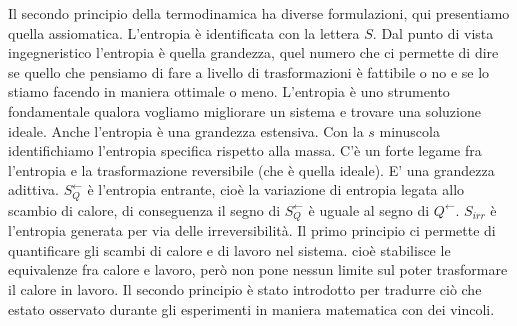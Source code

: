 \newline[12] Il secondo principio della termodinamica ha diverse formulazioni, qui presentiamo quella assiomatica. L'entropia è identificata con la lettera $S$. Dal punto di vista ingegneristico l'entropia è quella grandezza, quel numero che ci permette di dire se quello che pensiamo di fare a livello di trasformazioni è fattibile o no e se lo stiamo facendo in maniera ottimale o meno. L'entropia è uno strumento fondamentale qualora vogliamo migliorare un sistema e trovare una soluzione ideale.
\newline[13] Anche l'entropia è una grandezza estensiva. Con la $s$ minuscola identifichiamo l'entropia specifica rispetto alla massa. C'è un forte legame fra l'entropia e la trasformazione reversibile (che è quella ideale).
\newline[14] E' una grandezza adittiva.
\newline[15] $S_Q^{\leftarrow  }$ è l'entropia entrante, cioè la variazione di entropia legata allo scambio di calore, di conseguenza il segno di $S_Q^{\leftarrow  }$ è uguale al segno di $Q^{\leftarrow }$. $S_{irr}$ è l'entropia generata per via delle irreversibilità.
\newline[16] Il primo principio ci permette di quantificare gli scambi di calore e di lavoro nel sistema. cioè stabilisce le equivalenze fra calore e lavoro, però non pone nessun limite sul poter trasformare il calore in lavoro. Il secondo principio è stato introdotto per tradurre ciò che estato osservato durante gli esperimenti in maniera matematica con dei vincoli.
